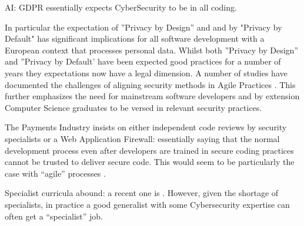 \documentclass[conference]{IEEEtran}
\begin{document}
AI: GDPR essentially expects CyberSecurity to be in all coding. 

In particular the expectation of ''Privacy by Design'' and and by "Privacy by Default" has significant implications for all software development with a European context that processes personal data. Whilst both ''Privacy by Design'' and ''Privacy by Default' have been expected good practices for a number of years they expectations now have a legal dimension. A number of studies have documented the challenges of aligning security methods in Agile Practices \cite{vanderHeijden:2018:EPS:3239235.3267426}. This further emphasizes the need for mainstream software developers and by extension Computer Science graduates to be versed in relevant security practices.

The Payments Industry \cite[6.6]{PCI2018b} insists on either independent code reviews by security specialists or a Web Application Firewall: essentially saying that the normal development process even after developers are trained in secure coding practices \cite[6.5]{PCI2018b} cannot be trusted to deliver secure code. This would seem to be particularly the case with ``agile'' processes \cite{Bartsch2011a}.

Specialist curricula abound: a recent one is \cite{ACMIEEEAISSIGSECIFIP}. However, given the shortage of specialists, in practice a good generalist with some Cybersecurity expertise can often get a ``specialist'' job.
\end{document}
